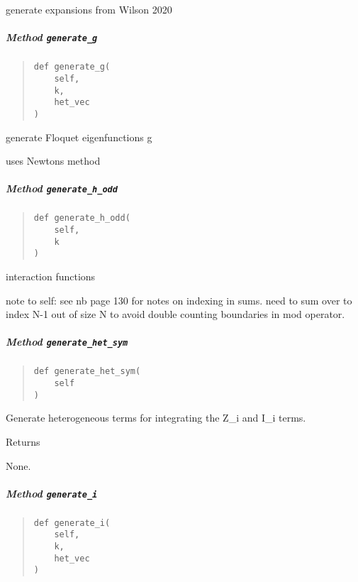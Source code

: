 \documentclass[
  english,
  a4paper,
  oneside]{article}
\begin{document}
generate expansions from Wilson 2020

\hypertarget{StrongCoupling.StrongCoupling.generate_g}{%
\subparagraph{\texorpdfstring{Method
\texttt{generate\_g}}{Method generate\_g}}\label{StrongCoupling.StrongCoupling.generate_g}}

\begin{quote}
\begin{verbatim}
def generate_g(
    self,
    k,
    het_vec
)
\end{verbatim}
\end{quote}

generate Floquet eigenfunctions g

uses Newtons method

\hypertarget{StrongCoupling.StrongCoupling.generate_h_odd}{%
\subparagraph{\texorpdfstring{Method
\texttt{generate\_h\_odd}}{Method generate\_h\_odd}}\label{StrongCoupling.StrongCoupling.generate_h_odd}}

\begin{quote}
\begin{verbatim}
def generate_h_odd(
    self,
    k
)
\end{verbatim}
\end{quote}

interaction functions

note to self: see nb page 130 for notes on indexing in sums. need to sum
over to index N-1 out of size N to avoid double counting boundaries in
mod operator.

\hypertarget{StrongCoupling.StrongCoupling.generate_het_sym}{%
\subparagraph{\texorpdfstring{Method
\texttt{generate\_het\_sym}}{Method generate\_het\_sym}}\label{StrongCoupling.StrongCoupling.generate_het_sym}}

\begin{quote}
\begin{verbatim}
def generate_het_sym(
    self
)
\end{verbatim}
\end{quote}

Generate heterogeneous terms for integrating the Z\_i and I\_i terms.

Returns

None.

\hypertarget{StrongCoupling.StrongCoupling.generate_i}{%
\subparagraph{\texorpdfstring{Method
\texttt{generate\_i}}{Method generate\_i}}\label{StrongCoupling.StrongCoupling.generate_i}}

\begin{quote}
\begin{verbatim}
def generate_i(
    self,
    k,
    het_vec
)
\end{verbatim}
\end{quote}
\end{document}
